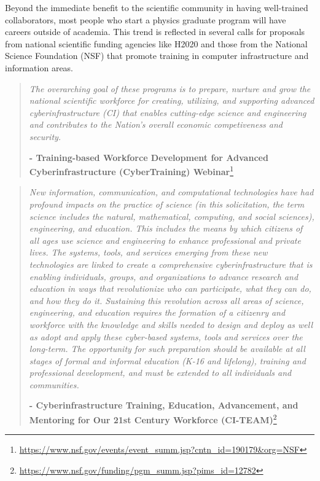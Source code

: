 Beyond the immediate benefit to the scientific community in having well-trained collaborators, most people who start a physics graduate program will have careers outside of academia. This trend is reflected in several calls for proposals from national scientific funding agencies like H2020 and those from the National Science Foundation (NSF) that promote training in computer infrastructure and information areas.  


\begin{quote}
\it The overarching goal of these programs is to prepare, nurture and grow the national scientific workforce for creating, utilizing, and supporting advanced cyberinfrastructure (CI) that enables cutting-edge science and engineering and contributes to the Nation's overall economic competiveness and security. 

{\bf - Training-based Workforce Development for Advanced Cyberinfrastructure (CyberTraining) Webinar}\footnote{ \url{https://www.nsf.gov/events/event_summ.jsp?cntn_id=190179&org=NSF}}
\end{quote}


\begin{quote}
\it New information, communication, and computational technologies have had profound impacts on the practice of science (in this solicitation, the term science includes the natural, mathematical, computing, and social sciences),  engineering, and education. This includes the means by which citizens of all ages use science  and engineering to enhance professional and private lives.  The systems, tools, and services emerging from these new technologies are linked to create a comprehensive cyberinfrastructure that is enabling individuals, groups, and organizations to advance research and education in ways that revolutionize who can participate, what they can do, and how they do it. Sustaining this revolution across all areas of science, engineering, and education requires the formation of a citizenry and workforce with the knowledge and skills needed to design and deploy as well as adopt and apply these cyber-based systems, tools and services over the long-term. The opportunity for such preparation should be available at all stages of formal and informal education (K-16 and lifelong), training and professional development, and must be extended to all individuals and communities. 

{\bf - Cyberinfrastructure Training, Education, Advancement, and Mentoring for Our 21st Century Workforce (CI-TEAM)}\footnote{ \url{https://www.nsf.gov/funding/pgm_summ.jsp?pims_id=12782}}
\end{quote}

